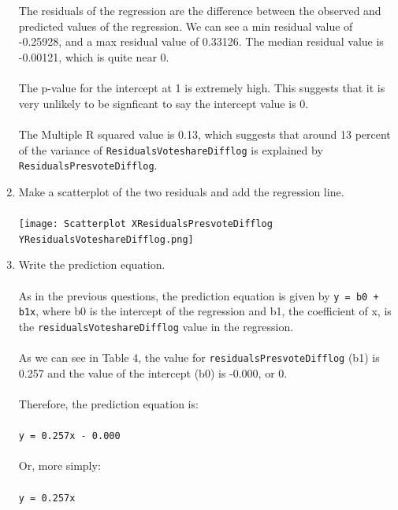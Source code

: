 \documentclass[12pt,letterpaper]{article}
\begin{document}
\begin{enumerate}
\\\\
\noindent The residuals of the regression are the difference between the observed and predicted values of the regression. We can see a min residual value of -0.25928, and a max residual value of 0.33126. The median residual value is -0.00121, which is quite near 0.
\\\\
\noindent The p-value for the intercept at 1 is extremely high. This suggests that it is very unlikely to be signficant to say the intercept value is 0. 
\\\\
\noindent The Multiple R squared value is 0.13, which suggests that around 13 percent of the variance of \texttt{ResidualsVoteshareDifflog} is explained by \texttt{ResidualsPresvoteDifflog}.

\newpage
		\item Make a scatterplot of the two residuals and add the regression line.
\\\\		
\texttt{[image: Scatterplot XResidualsPresvoteDifflog YResidualsVoteshareDifflog.png]}
\newpage		
		\item Write the prediction equation.
\\\\
\noindent As in the previous questions, the prediction equation is given by \texttt{y = b0 + b1x}, where b0 is the intercept of the regression and b1, the coefficient of x, is the \texttt{residualsVoteshareDifflog} value in the regression.
\\\\
\noindent As we can see in Table 4, the value for \texttt{residualsPresvoteDifflog} (b1) is 0.257 and the value of the intercept (b0) is -0.000, or 0.
\\\\
\noindent Therefore, the prediction equation is:
\\\\
\noindent \texttt{y = 0.257x - 0.000}
\\\\
\noindent Or, more simply:
\\\\
\noindent \texttt{y = 0.257x}
	\end{enumerate}
	
	\newpage	
\end{document}
